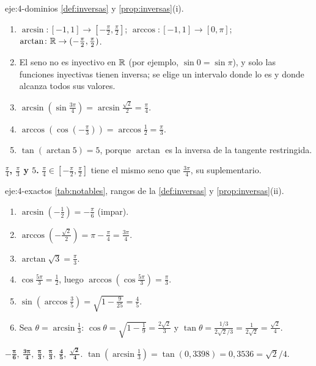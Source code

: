 \begin{solucion}{eje:4-dominios}
\planteamiento \cref{def:inversas} y \cref{prop:inversas}(i).
\pasos
\begin{enumerate}[label=\arabic*.]
  \item $\arcsin\colon[-1,1]\to[-\frac{\pi}{2},\frac{\pi}{2}]$; $\arccos\colon[-1,1]\to[0,\pi]$; $\arctan\colon\mathbb{R}\to(-\frac{\pi}{2},\frac{\pi}{2})$.
  \item El seno no es inyectivo en $\mathbb{R}$ (por ejemplo, $\sin0=\sin\pi$), y solo las funciones inyectivas tienen inversa; se elige un intervalo donde lo es y donde alcanza todos sus valores.
  \item $\arcsin(\sin\frac{3\pi}{4})=\arcsin\frac{\sqrt2}{2}=\frac{\pi}{4}$.
  \item $\arccos(\cos(-\frac{\pi}{3}))=\arccos\frac12=\frac{\pi}{3}$.
  \item $\tan(\arctan5)=5$, porque $\arctan$ es la inversa de la tangente restringida.
\end{enumerate}
\resultado \textbf{$\frac{\pi}{4}$, $\frac{\pi}{3}$ y $5$.}
\comprobacion $\frac{\pi}{4}\in[-\frac{\pi}{2},\frac{\pi}{2}]$ tiene el mismo seno que $\frac{3\pi}{4}$, su suplementario.
\end{solucion}

\begin{solucion}{eje:4-exactos}
\planteamiento \cref{tab:notables}, rangos de la \cref{def:inversas} y \cref{prop:inversas}(ii).
\pasos
\begin{enumerate}[label=\arabic*.]
  \item $\arcsin(-\frac12)=-\frac{\pi}{6}$ (impar).
  \item $\arccos(-\frac{\sqrt2}{2})=\pi-\frac{\pi}{4}=\frac{3\pi}{4}$.
  \item $\arctan\sqrt3=\frac{\pi}{3}$.
  \item $\cos\frac{5\pi}{3}=\frac12$, luego $\arccos(\cos\frac{5\pi}{3})=\frac{\pi}{3}$.
  \item $\sin(\arccos\frac35)=\sqrt{1-\frac{9}{25}}=\frac45$.
  \item Sea $\theta=\arcsin\frac13$: $\cos\theta=\sqrt{1-\frac19}=\frac{2\sqrt2}{3}$ y $\tan\theta=\frac{1/3}{2\sqrt2/3}=\frac{1}{2\sqrt2}=\frac{\sqrt2}{4}$.
\end{enumerate}
\resultado $\mathbf{-\frac{\pi}{6},\ \frac{3\pi}{4},\ \frac{\pi}{3},\ \frac{\pi}{3},\ \frac45,\ \frac{\sqrt2}{4}}$.
\comprobacion $\tan(\arcsin\frac13)=\tan(0{,}3398)=0{,}3536=\sqrt2/4$.
\end{solucion}

